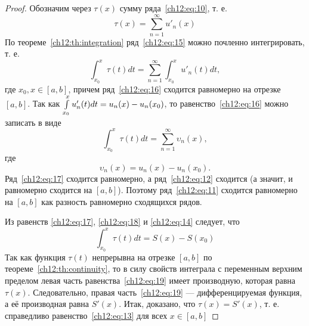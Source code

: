 \begin{proof}
	Обозначим через $\tau(x)$ сумму ряда~\eqref{ch12:eq:10}, т. е.
	\begin{equation}
		\label{ch12:eq:15}
		\tau(x) = \sum_{n=1}^{\infty} u'_n(x)
	\end{equation}
	По теореме~\ref{ch12:th:integration} ряд~\eqref{ch12:eq:15} можно почленно интегрировать, т. е.
	\begin{equation}
		\label{ch12:eq:16}
		\int_{x_0}^x \tau(t)dt = \sum_{n=1}^{\infty} \int_{x_0}^x u'_n(t)dt,
	\end{equation}
	где $x_0, x \in [a, b]$, причем ряд~\eqref{ch12:eq:16} сходится равномерно на отрезке $[a, b]$.
	Так как $\int_{x_0}^x\limits u'_n(t)dt = u_n(x) - u_n(x_0)$, то равенство~\eqref{ch12:eq:16}
	можно записать в виде
	\begin{equation}
		\label{ch12:eq:17}
		\int_{x_0}^x \tau(t)dt = \sum_{n=1}^{\infty} \upsilon_n(x),
	\end{equation}
	где
	\begin{equation}
		\label{ch12:eq:18}
		\upsilon_n(x) = u_n(x) - u_n(x_0).
	\end{equation}
	Ряд~\eqref{ch12:eq:17} сходится равномерно, а ряд~\eqref{ch12:eq:12} сходится
	(а значит, и равномерно сходится на $[a, b]$). Поэтому ряд~\eqref{ch12:eq:11}
	сходится равномерно на $[a, b]$ как разность равномерно сходящихся рядов.

	Из равенств \eqref{ch12:eq:17}, \eqref{ch12:eq:18} и \eqref{ch12:eq:14} следует, что
	\begin{equation}
		\label{ch12:eq:19}
		\int_{x_0}^x \tau(t)dt = S(x) - S(x_0)
	\end{equation}
	Так как функция $\tau(t)$ непрерывна на отрезке $[a, b]$ по теореме~\ref{ch12:th:continuity},
	то в силу свойств интеграла с переменным верхним пределом левая часть равенства~\eqref{ch12:eq:19}
	имеет производную, которая равна $\tau(x)$. Следовательно, правая часть~\eqref{ch12:eq:19} ---
	дифференцируемая функция, а её производная равна $S'(x)$. Итак, доказано, что $\tau(x) = S'(x)$,
	т. е. справедливо равенство~\eqref{ch12:eq:13} для всех $x \in [a, b]$
\end{proof}